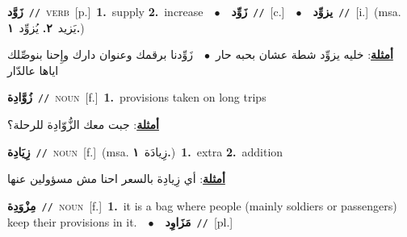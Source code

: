 \documentclass[10pt,a4paper,twoside]{article} %
\begin{document}
\begin{multicols}{2}
{\setlength\topsep{0pt}\textbf{\foreignlanguage{arabic}{زَوَّد}}\ {\color{gray}\texttt{//}\color{black}}\ \textsc{verb}\ [p.]\ \textbf{1.}~supply  \textbf{2.}~increase\ \ $\bullet$\ \ \setlength\topsep{0pt}\textbf{\foreignlanguage{arabic}{زَوِّد}}\ {\color{gray}\texttt{//}\color{black}}\ [c.]\ \ $\bullet$\ \ \setlength\topsep{0pt}\textbf{\foreignlanguage{arabic}{يزوِّد}}\ {\color{gray}\texttt{//}\color{black}}\ [i.]\ \color{gray}(msa. \foreignlanguage{arabic}{يَزيد}~\foreignlanguage{arabic}{\textbf{٢.}}  \foreignlanguage{arabic}{يُزوِّد}~\foreignlanguage{arabic}{\textbf{١.}})\color{black}\  \begin{flushright}\color{gray}\foreignlanguage{arabic}{\textbf{\underline{\foreignlanguage{arabic}{أمثلة}}}: خليه يزوِّد شطة عشان بحبه حار\ $\bullet$\ \  زَوِّدنا برقمك وعنوان دارك وإِحنا بنوصِّلك اياها عالدّار}\end{flushright}\color{black}} \vspace{2mm}

{\setlength\topsep{0pt}\textbf{\foreignlanguage{arabic}{زُوَّادِة}}\ {\color{gray}\texttt{//}\color{black}}\ \textsc{noun}\ [f.]\ \textbf{1.}~provisions taken on long trips\  \begin{flushright}\color{gray}\foreignlanguage{arabic}{\textbf{\underline{\foreignlanguage{arabic}{أمثلة}}}: جبت معك الزُّوّادِة للرحلة؟}\end{flushright}\color{black}} \vspace{2mm}

{\setlength\topsep{0pt}\textbf{\foreignlanguage{arabic}{زِيَادِة}}\ {\color{gray}\texttt{//}\color{black}}\ \textsc{noun}\ [f.]\ \color{gray}(msa. \foreignlanguage{arabic}{زِيادَة}~\foreignlanguage{arabic}{\textbf{١.}})\color{black}\ \textbf{1.}~extra  \textbf{2.}~addition\  \begin{flushright}\color{gray}\foreignlanguage{arabic}{\textbf{\underline{\foreignlanguage{arabic}{أمثلة}}}: أي زِيادِة بالسعر احنا مش مسؤولين عنها}\end{flushright}\color{black}} \vspace{2mm}

{\setlength\topsep{0pt}\textbf{\foreignlanguage{arabic}{مِزْوَدِة}}\ {\color{gray}\texttt{//}\color{black}}\ \textsc{noun}\ [f.]\ \textbf{1.}~it is a bag where people (mainly soldiers or passengers) keep their provisions in it.\ \ $\bullet$\ \ \setlength\topsep{0pt}\textbf{\foreignlanguage{arabic}{مَزَاوِد}}\ {\color{gray}\texttt{//}\color{black}}\ [pl.]\ } \vspace{2mm}


\end{multicols}
\end{document}
